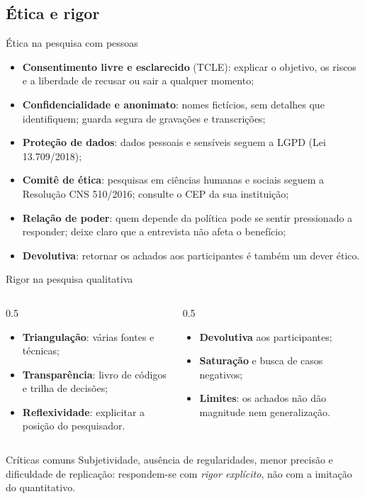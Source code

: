 \subsection{Ética e rigor}

\begin{frame}{Ética na pesquisa com pessoas}
  \small
  \begin{itemize}
    \item \textbf{Consentimento livre e esclarecido} (TCLE): explicar o objetivo, os riscos e a liberdade de recusar ou sair a qualquer momento;
    \item \textbf{Confidencialidade e anonimato}: nomes fictícios, sem detalhes que identifiquem; guarda segura de gravações e transcrições;
    \item \textbf{Proteção de dados}: dados pessoais e sensíveis seguem a LGPD (Lei 13.709/2018);
    \item \textbf{Comitê de ética}: pesquisas em ciências humanas e sociais seguem a Resolução CNS 510/2016; consulte o CEP da sua instituição;
    \item \textbf{Relação de poder}: quem depende da política pode se sentir pressionado a responder; deixe claro que a entrevista não afeta o benefício;
    \item \textbf{Devolutiva}: retornar os achados aos participantes é também um dever ético.
  \end{itemize}
\end{frame}

\begin{frame}{Rigor na pesquisa qualitativa}
  \begin{columns}[T]
    \begin{column}{0.5\textwidth}
      \begin{itemize}
        \item \textbf{Triangulação}: várias fontes e técnicas;
        \item \textbf{Transparência}: livro de códigos e trilha de decisões;
        \item \textbf{Reflexividade}: explicitar a posição do pesquisador.
      \end{itemize}
    \end{column}
    \begin{column}{0.5\textwidth}
      \begin{itemize}
        \item \textbf{Devolutiva} aos participantes;
        \item \textbf{Saturação} e busca de casos negativos;
        \item \textbf{Limites}: os achados não dão magnitude nem generalização.
      \end{itemize}
    \end{column}
  \end{columns}
  \vspace{0.3cm}
  \begin{block}{Críticas comuns}
    \small Subjetividade, ausência de regularidades, menor precisão e dificuldade de replicação: respondem-se com \emph{rigor explícito}, não com a imitação do quantitativo.
  \end{block}
\end{frame}

